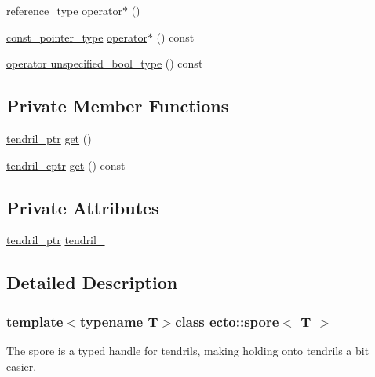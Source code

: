 \begin{DoxyCompactItemize}
\item 
\hyperlink{structecto_1_1spore_a79afa6b324736afc257bc89c6c770f81}{reference\-\_\-type} \hyperlink{structecto_1_1spore_a6d693f3096c3fede0c85351d36adaded}{operator$\ast$} ()
\item 
\hyperlink{structecto_1_1spore_af1219cc7b5343824699fc7f66a5c5891}{const\-\_\-pointer\-\_\-type} \hyperlink{structecto_1_1spore_ae13ad63a891e8ed71d9010c18b754588}{operator$\ast$} () const 
\item 
\hyperlink{structecto_1_1spore_ae47aff3850e59591aed5fe2ad0b8d567}{operator unspecified\-\_\-bool\-\_\-type} () const 
\end{DoxyCompactItemize}
\subsection*{\-Private \-Member \-Functions}
\begin{DoxyCompactItemize}
\item 
\hyperlink{namespaceecto_a84fb5f6130275382e5cbeb5fdececa78}{tendril\-\_\-ptr} \hyperlink{structecto_1_1spore_a42f435f8c44fea74854382e0526e36ca}{get} ()
\item 
\hyperlink{namespaceecto_ad01f26ee47597f71a6f86ee34bb3ffe4}{tendril\-\_\-cptr} \hyperlink{structecto_1_1spore_a07c4091d4e5c14c30de319ec0f14b7de}{get} () const 
\end{DoxyCompactItemize}
\subsection*{\-Private \-Attributes}
\begin{DoxyCompactItemize}
\item 
\hyperlink{namespaceecto_a84fb5f6130275382e5cbeb5fdececa78}{tendril\-\_\-ptr} \hyperlink{structecto_1_1spore_a17e2ffe6861f828cad58904d20f117d4}{tendril\-\_\-}
\end{DoxyCompactItemize}


\subsection{\-Detailed \-Description}
\subsubsection*{template$<$typename \-T$>$class ecto\-::spore$<$ T $>$}

\-The spore is a typed handle for tendrils, making holding onto tendrils a bit easier. 

